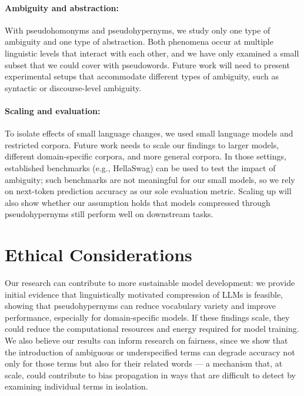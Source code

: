 \documentclass[final]{clv2025}
\begin{document}
\paragraph{Ambiguity and abstraction:} With pseudohomonyms and pseudohypernyms, we study only one type of ambiguity and one type of abstraction. Both phenomena occur at multiple linguistic levels that interact with each other, and we have only examined a small subset that we could cover with pseudowords. Future work will need to present experimental setups that accommodate different types of ambiguity, such as syntactic or discourse-level ambiguity.
\paragraph{Scaling and evaluation:} To isolate effects of small language changes, we used small language models and restricted corpora. Future work needs to scale our findings to larger models, different domain-specific corpora, and more general corpora. In those settings, established benchmarks (e.g., HellaSwag) can be used to test the impact of ambiguity; such benchmarks are not meaningful for our small models, so we rely on next-token prediction accuracy as our sole evaluation metric. Scaling up will also show whether our assumption holds that models compressed through pseudohypernyms still perform well on downstream tasks.
\section*{Ethical Considerations}
Our research can contribute to more sustainable model development: we provide initial evidence that linguistically motivated compression of LLMs is feasible, showing that pseudohypernyms can reduce vocabulary variety and improve performance, especially for domain-specific models. If these findings scale, they could reduce the computational resources and energy required for model training. We also believe our results can inform research on fairness, since we show that the introduction of ambiguous or underspecified terms can degrade accuracy not only for those terms but also for their related words — a mechanism that, at scale, could contribute to bias propagation in ways that are difficult to detect by examining individual terms in isolation.


\end{document}
